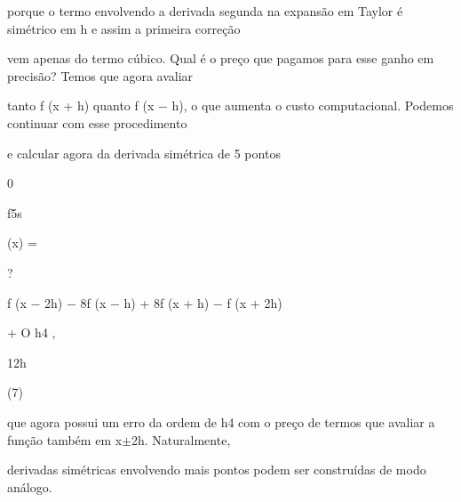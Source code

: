 \documentclass[a4paper,portrait,12pt]{article}
\begin{document}
\begin{flushleft}
porque o termo envolvendo a derivada segunda na expans\~{a}o em Taylor \'{e} sim\'{e}trico em h e assim a primeira corre\c{c}\~{a}o
\end{flushleft}


\begin{flushleft}
vem apenas do termo c\'{u}bico. Qual \'{e} o pre\c{c}o que pagamos para esse ganho em precis\~{a}o? Temos que agora avaliar
\end{flushleft}


\begin{flushleft}
tanto f (x + h) quanto f (x $-$ h), o que aumenta o custo computacional. Podemos continuar com esse procedimento
\end{flushleft}


\begin{flushleft}
e calcular agora da derivada sim\'{e}trica de 5 pontos
\end{flushleft}


0


\begin{flushleft}
f5s
\end{flushleft}


\begin{flushleft}
(x) =
\end{flushleft}





?


\begin{flushleft}
f (x $-$ 2h) $-$ 8f (x $-$ h) + 8f (x + h) $-$ f (x + 2h)
\end{flushleft}


\begin{flushleft}
+ O h4 ,
\end{flushleft}


\begin{flushleft}
12h
\end{flushleft}





(7)





\begin{flushleft}
que agora possui um erro da ordem de h4 com o pre\c{c}o de termos que avaliar a fun\c{c}\~{a}o tamb\'{e}m em x$\pm$2h. Naturalmente,
\end{flushleft}


\begin{flushleft}
derivadas sim\'{e}tricas envolvendo mais pontos podem ser constru\'{i}das de modo an\'{a}logo.
\end{flushleft}
\end{document}

